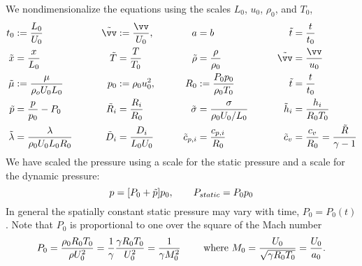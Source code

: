 \documentclass[10pt]{article}
\begin{document}
We nondimensionalize the equations using the scales $L_0$, $u_0$, $\rho_0$, and $T_0$,
\begin{alignat*}{4}
  t_0 &:={L_0 \over U_0} & \qquad \vvt &:={\vv \over U_0}, &
        \qquad    a & = b         &  \qquad \tilde{t} &= {t\over t_0} \\
  \tilde{x} &= {x\over L_0}  &  \qquad  \tilde{T} &= { T \over T_0 } &
       \qquad \tilde{\rho} &= { \rho \over \rho_0 } &    \qquad \tilde{\vv} &= {\vv\over u_0} \\
  \mut &:={\mu \over \rho_o U_0 L_0 } & \qquad p_0 &:=\rho_0 u_0^2, &
        \qquad R_0 & := {P_0 p_0\over \rho_0 T_0} &  \qquad \tilde{t} &= {t\over t_0} \\
  \tilde{p} &= {p \over p_0} - P_0 &   \qquad \Rt_i&= { R_i \over R_0}   &
        \qquad\tilde{\sigma} &= {\sigma \over {\rho_0 U_0/ L_0}} &  
        \qquad \tilde{h}_i &= { h_i \over R_0 T_0} \\
  \tilde{\lambda} &= {\lambda\over \rho_0 U_0 L_0 R_0} &  \qquad\Dt_i &= { D_i \over L_0 U_0} &
      \qquad \ct_{p,i} &= { c_{p,i} \over R_0} & \qquad \ct_v &= { c_v \over R_0} = {\Rt \over \gamma-1}
\end{alignat*}
We have scaled the pressure using a scale for the static pressure and a scale for the dynamic pressure:
\[
   p = [ P_0 + \tilde{p} ] p_0 , \qquad P_{static} = P_0 p_0
\]
In general the spatially constant static pressure may vary with time,  $P_0=P_0(t)$. Note that $P_0$ is
proportional to one over the square of the Mach number
\[
 P_0 = { \rho_0 R_0 T_0 \over \rho U_0^2 } = {1\over  \gamma } { \gamma R_0 T_0 \over U_0^2 } = {1\over \gamma M_0^2}
  \qquad \mbox{ where } M_0 = {U_0 \over \sqrt{\gamma R_0 T_0}} = {U_0 \over a_0}.
\]
\end{document}
